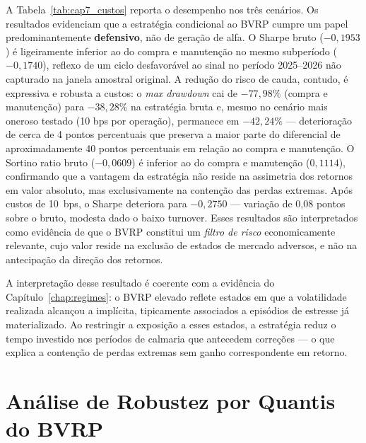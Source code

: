 \begin{table}[H]
\centering
\caption{Sensibilidade a custos de transação --- estratégia condicional ao BVRP (quantil 80\%)}
\label{tab:cap7_custos}

\end{table}

A Tabela~\ref{tab:cap7_custos} reporta o desempenho nos três cenários.
Os resultados evidenciam que a estratégia condicional ao BVRP cumpre um papel
predominantemente \textbf{defensivo}, não de geração de alfa. O Sharpe bruto
($-0{,}1953$) é ligeiramente inferior ao do compra e manutenção no mesmo
subperíodo ($-0{,}1740$), reflexo de um ciclo desfavorável ao sinal no
período 2025--2026 não capturado na janela amostral original. A redução do risco de cauda, contudo, é expressiva e robusta a custos: o \emph{max drawdown} cai de $-77{,}98\%$ (compra e manutenção) para $-38{,}28\%$ na estratégia bruta e, mesmo no cenário mais oneroso testado (10 bps por operação), permanece em $-42{,}24\%$ --- deterioração de cerca de 4 pontos percentuais que preserva a maior parte do diferencial de aproximadamente 40 pontos percentuais em relação ao compra e manutenção. O Sortino ratio
bruto ($-0{,}0609$) é inferior ao do compra e manutenção ($0{,}1114$),
confirmando que a vantagem da estratégia não reside na assimetria dos retornos
em valor absoluto, mas exclusivamente na contenção das perdas extremas. Após
custos de 10~bps, o Sharpe deteriora para $-0{,}2750$ --- variação de
0{,}08 pontos sobre o bruto, modesta dado o baixo turnover. Esses resultados
são interpretados como evidência de que o BVRP constitui um \textit{filtro
de risco} economicamente relevante, cujo valor reside na exclusão de estados
de mercado adversos, e não na antecipação da direção dos retornos.

A interpretação desse resultado é coerente com a evidência do Capítulo~\ref{chap:regimes}: o BVRP elevado reflete estados em que a volatilidade realizada alcançou a implícita, tipicamente associados a episódios de estresse já materializado. Ao restringir a exposição a esses estados, a estratégia reduz o tempo investido nos períodos de calmaria que antecedem correções --- o que explica a contenção de perdas extremas sem ganho correspondente em retorno.

\section{Análise de Robustez por Quantis do BVRP}
\label{sec:cap7_bvrp_multiq}

